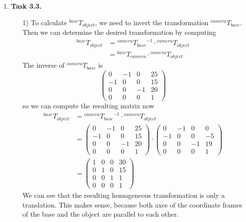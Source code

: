 \documentclass[a4paper,11pt]{article}
\begin{document}
\begin {enumerate}
\item[\textbf{Task 3.3.}]

    \begin{enumerate}
        \item[1)] To calculate ${^{base}T_{object}}$, we need to invert the transformation ${^{camera}T_{base}}$. Then we can determine the desired transformation by computing
        \begin{align*}
          {^{base}T_{object}} &= {^{camera}T_{base}}^{-1} \cdot {^{camera}T_{object}}\\
          &= {^{base}T_{camera}} \cdot {^{camera}T_{object}}
        \end{align*}
        The inverse of ${^{camera}T_{base}}$ is
        $$\begin{pmatrix}
          0 & -1 & 0 & 25\\
          -1 & 0 & 0 & 15\\
          0 & 0 & -1 & 20\\
          0 & 0 & 0 & 1
        \end{pmatrix}$$
        so we can compute the resulting matrix now
        \begin{align*}
          {^{base}T_{object}} &= {^{camera}T_{base}}^{-1} \cdot {^{camera}T_{object}}\\
          &= \begin{pmatrix}
            0 & -1 & 0 & 25\\
            -1 & 0 & 0 & 15\\
            0 & 0 & -1 & 20\\
            0 & 0 & 0 & 1
          \end{pmatrix} \cdot
          \begin{pmatrix}
            0 & -1 & 0 & 0\\
            -1 & 0 & 0 & -5\\
            0 & 0 & -1 & 19\\
            0 & 0 & 0 & 1
          \end{pmatrix}\\
          &= \begin{pmatrix}
            1 & 0 & 0 & 30\\
            0 & 1 & 0 & 15\\
            0 & 0 & 1 & 1\\
            0 & 0 & 0 & 1
          \end{pmatrix}
        \end{align*}
        We can see that the resulting homogeneous transformation is only a translation. This makes sense, because both axes of the coordinate frames of the base and the object are parallel to each other.



\end{enumerate}
\end{enumerate}
\end{document}
